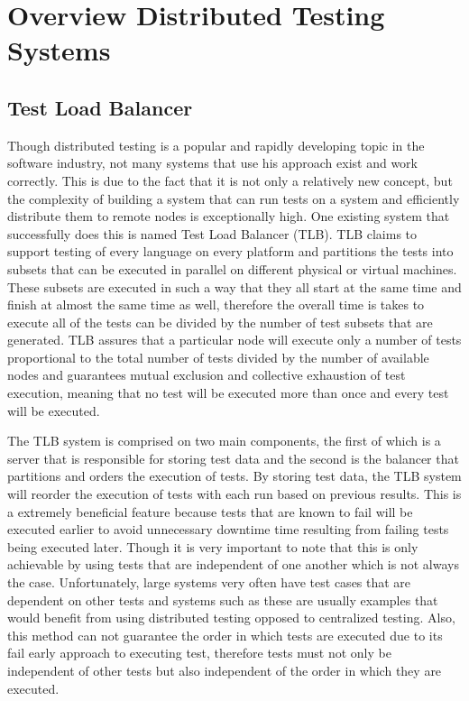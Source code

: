\documentclass{article}
\begin{document}
{\section{Overview Distributed Testing Systems}
\label{related}
\subsection{Test Load Balancer}
\label{existing}

Though distributed testing is a popular and rapidly developing topic in the software industry, not many systems that use his approach exist and work correctly. This is due to the fact that it is not only a relatively new concept, but the complexity of building a system that can run tests on a system and efficiently distribute them to remote nodes is exceptionally high. One existing system that successfully does this is named Test Load Balancer (TLB). TLB claims to support testing of every language on every platform and partitions the tests into subsets that can be executed in parallel on different physical or virtual machines. These subsets are executed in such a way that they all start at the same time and finish at almost the same time as well, therefore the overall time is takes to execute all of the tests can be divided by the number of test subsets that are generated. TLB assures that a particular node will execute only a number of tests proportional to the total number of tests divided by the number of available nodes and guarantees mutual exclusion and collective exhaustion of test execution, meaning that no test will be executed more than once and every test will be executed.

The TLB system is comprised on two main components, the first of which is a server that is responsible for storing test data and the second is the balancer that partitions and orders the execution of tests. By storing test data, the TLB system will reorder the execution of tests with each run based on previous results. This is a extremely beneficial feature because tests that are known to fail will be executed earlier to avoid unnecessary downtime time resulting from failing tests being executed later. Though it is very important to note that this is only achievable by using tests that are independent of one another which is not always the case. Unfortunately, large systems very often have test cases that are dependent on other tests and systems such as these are usually examples that would benefit from using distributed testing opposed to centralized testing. Also, this method can not guarantee the order in which tests are executed due to its fail early approach to executing test, therefore tests must not only be independent of other tests but also independent of the order in which they are executed.

}
\end{document}
